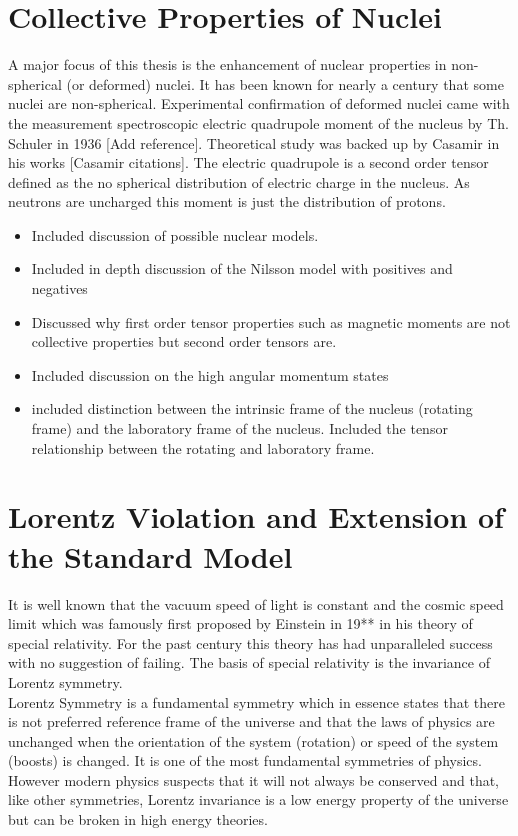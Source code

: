 \documentclass[10pt,a4paper]{report}
\begin{document}
\section{Collective Properties of Nuclei}
A major focus of this thesis is the enhancement of nuclear properties in non-spherical (or deformed) nuclei. It has been known for nearly a century that some nuclei are non-spherical.  Experimental confirmation of deformed nuclei came with the measurement spectroscopic electric quadrupole moment of the nucleus by Th. Schuler in 1936 [Add reference]. Theoretical study was backed up by Casamir in his works [Casamir citations]. The electric quadrupole is a second order tensor defined as the no spherical distribution of electric charge in the nucleus. As neutrons are uncharged this moment is just the distribution of protons. 
\begin{itemize}
\item Included discussion of possible nuclear models.
\item Included in depth discussion of the Nilsson model with positives and negatives
\item Discussed why first order tensor properties such as magnetic moments are not collective properties but second order tensors are.
\item Included discussion on the high angular momentum states
\item included distinction between the intrinsic frame of the nucleus (rotating frame) and the laboratory frame of the nucleus. Included the tensor relationship between the rotating and laboratory frame.
\end{itemize}
\section{Lorentz Violation and Extension of the Standard Model}
It is well known that the vacuum speed of light is constant and the cosmic speed limit which was famously first proposed by Einstein in 19** in his theory of special relativity. For the past century this theory has had unparalleled success with no suggestion of failing. The basis of special relativity is the invariance of Lorentz symmetry. \\

Lorentz Symmetry is a fundamental symmetry which in essence states that there is not preferred reference frame of the universe and that the laws of physics are unchanged when the orientation of the system (rotation) or speed of the system (boosts) is changed. It is one of the most fundamental symmetries of physics. However modern physics suspects that it will not always be conserved and that, like other symmetries, Lorentz invariance is a low energy property of the universe but can be broken in high energy theories.
\end{document}
